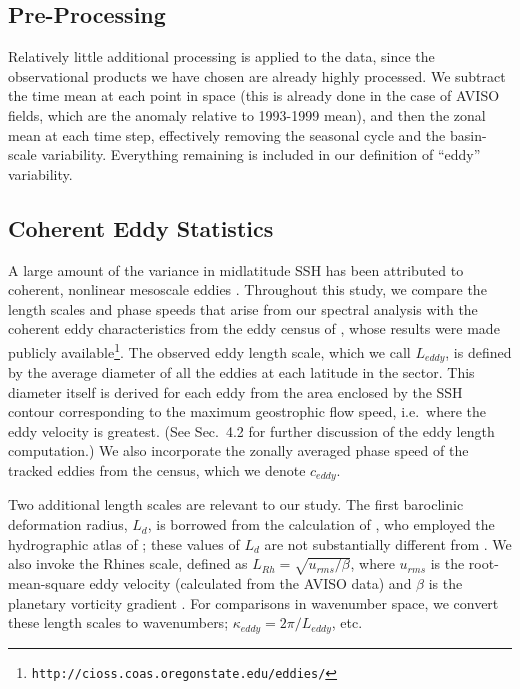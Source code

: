 \documentclass[10pt]{article}
\begin{document}
\subsection{Pre-Processing}

Relatively little additional processing is applied to the data, since the observational products we have chosen are already highly processed. We subtract the time mean at each point in space (this is already done in the case of AVISO fields, which are the anomaly relative to 1993-1999 mean), and then the zonal mean at each time step, effectively removing the seasonal cycle and the basin-scale variability. Everything remaining is included in our definition of ``eddy'' variability.

\subsection{Coherent Eddy Statistics}

A large amount of the variance in midlatitude SSH has been attributed to coherent, nonlinear mesoscale eddies \citep{CheltonEtAl2011}. Throughout this study, we compare the length scales and phase speeds that arise from our spectral analysis with the coherent eddy characteristics from the eddy census of \citet{CheltonEtAl2011}, whose results were made publicly available\footnote{{\tt http://cioss.coas.oregonstate.edu/eddies/}}. The observed eddy length scale, which we call $L_{eddy}$, is defined by the average diameter of all the eddies at each latitude in the sector. This diameter itself is derived for each eddy from the area enclosed by the SSH contour corresponding to the maximum geostrophic flow speed, i.e.~where the eddy velocity is greatest. (See \citealt{CheltonEtAl2011} Sec.~4.2 for further discussion of the eddy length computation.) We also incorporate the zonally averaged phase speed of the tracked eddies from the census, which we denote $c_{eddy}$.

Two additional length scales are relevant to our study. The first baroclinic deformation radius, $L_d$, is borrowed from the calculation of \citet{TullochEtAl2009}, who employed the hydrographic atlas of \citet{Forget2010}; these values of $L_d$ are not substantially different from \citet{CheltonEtAl1998}. We also invoke the Rhines scale, defined as $L_{Rh} = \sqrt{u_{rms} / \beta}$, where $u_{rms}$ is the root-mean-square eddy velocity (calculated from the AVISO data) and $\beta$ is the planetary vorticity gradient \citep{Rhines1975}. For comparisons in wavenumber space, we convert these length scales to wavenumbers; $\kappa_{eddy} = 2 \pi / L_{eddy}$, etc.
\end{document}
